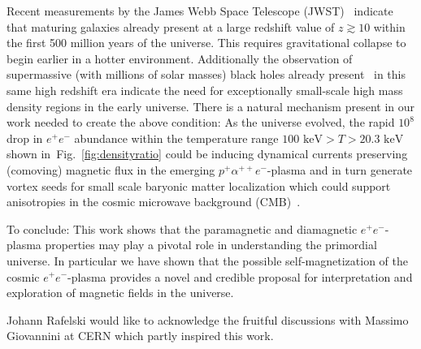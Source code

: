 \documentclass[aps,prd,floatfix,reprint]{revtex4-2}
\newcommand*{\keV}{\text{ keV}}
\newcommand{\rf}[1]{Fig.~{\ref{#1}}}
\begin{document}
Recent measurements by the James Webb Space Telescope (JWST)~\cite{Yan:2022sxd,adams2023discovery,arrabal2023spectroscopic} indicate that maturing galaxies already present at a large redshift value of $z\gtrsim10$ within the first 500 million years of the universe. This requires gravitational collapse to begin earlier in a hotter environment. Additionally the observation of supermassive (with millions of solar masses) black holes already present~\cite{CEERSTeam:2023qgy} in this same high redshift era indicate the need for exceptionally small-scale high mass density regions in the early universe. There is a natural mechanism present in our work needed to create the above condition: As the universe evolved, the rapid $10^{8}$ drop in $e^{+}e^{-}$ abundance within the temperature range $100\keV>T>20.3\keV$ shown in~\rf{fig:densityratio} could be inducing dynamical currents preserving (comoving) magnetic flux in the emerging $p^{+}\alpha^{++}e^{-}$-plasma and in turn generate vortex seeds for small scale baryonic matter localization which could support anisotropies in the cosmic microwave background (CMB)~\cite{Jedamzik:2013gua,Abdalla:2022yfr}.

To conclude: This work shows that the paramagnetic and diamagnetic $e^{+}e^{-}$-plasma properties may play a pivotal role in understanding the primordial universe. In particular we have shown that the possible self-magnetization of the cosmic $e^{+}e^{-}$-plasma  provides a novel and credible proposal for interpretation and exploration of magnetic fields in the universe. 


\acknowledgments
\label{sec:ack}
\noindent Johann Rafelski would like to acknowledge the fruitful discussions with Massimo Giovannini at CERN which partly inspired this work.



\end{document}
